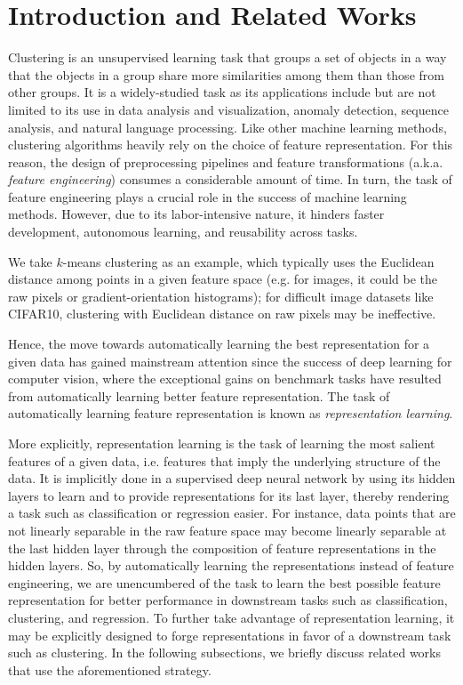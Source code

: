 \documentclass[conference]{IEEEtran}
\begin{document}
\section{Introduction and Related Works}
Clustering is an unsupervised learning task that groups a set of objects in a way that the objects in a group share more similarities among them than those from other groups. It is a widely-studied task as its applications include but are not limited to its use in data analysis and visualization, anomaly detection, sequence analysis, and natural language processing. Like other machine learning methods, clustering algorithms heavily rely on the choice of feature representation. For this reason, the design of preprocessing pipelines and feature transformations (a.k.a. \textit{feature engineering}) consumes a considerable amount of time. In turn, the task of feature engineering plays a crucial role in the success of machine learning methods. However, due to its labor-intensive nature, it hinders faster development, autonomous learning, and reusability across tasks.


We take $k$-means clustering as an example, which typically uses the Euclidean distance among points in a given feature space (e.g. for images, it could be the raw pixels or gradient-orientation histograms); for difficult image datasets like CIFAR10\cite{krizhevsky2009learning}, clustering with Euclidean distance on raw pixels may be ineffective.

Hence, the move towards automatically learning the best representation for a given data has gained mainstream attention since the success of deep learning for computer vision\cite{he2016deep, krizhevsky2012imagenet, simonyan2014very}, where the exceptional gains on benchmark tasks have resulted from automatically learning better feature representation. The task of automatically learning feature representation is known as \textit{representation learning}.

More explicitly, representation learning is the task of learning the most salient features of a given data, i.e. features that imply the underlying structure of the data. It is implicitly done in a supervised deep neural network by using its hidden layers to learn and to provide representations for its last layer, thereby rendering a task such as classification or regression easier. For instance, data points that are not linearly separable in the raw feature space may become linearly separable at the last hidden layer through the composition of feature representations in the hidden layers. So, by automatically learning the representations instead of feature engineering, we are unencumbered of the task to learn the best possible feature representation for better performance in downstream tasks such as classification, clustering, and regression.
To further take advantage of representation learning, it may be explicitly designed to forge representations in favor of a downstream task such as clustering. In the following subsections, we briefly discuss related works that use the aforementioned strategy.
\end{document}
